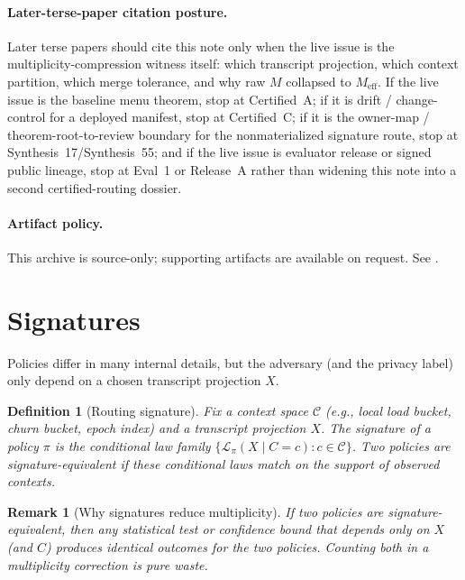\documentclass[11pt]{article}
\newtheorem{definition}{Definition}
\newtheorem{remark}{Remark}
\begin{document}
\paragraph{Later-terse-paper citation posture.}
Later terse papers should cite this note only when the live issue is the multiplicity-compression witness itself: which transcript projection, which context partition, which merge tolerance, and why raw $M$ collapsed to $M_{\mathrm{eff}}$. If the live issue is the baseline menu theorem, stop at Certified~A; if it is drift / change-control for a deployed manifest, stop at Certified~C; if it is the owner-map / theorem-root-to-review boundary for the nonmaterialized signature route, stop at Synthesis~17/Synthesis~55; and if the live issue is evaluator release or signed public lineage, stop at Eval~1 or Release~A rather than widening this note into a second certified-routing dossier.\cite{series:certifiedmenus,series:recert,series:workedexample,series:seriesspines,series:eval1,series:releaseA}

\paragraph{Artifact policy.}
This archive is source-only; supporting artifacts are available on request. See \cite{series:artifactpolicy}.

\section{Signatures}
Policies differ in many internal details, but the adversary (and the privacy label) only depend on a chosen transcript projection $X$.

\begin{definition}[Routing signature]
Fix a context space $\mathcal C$ (e.g., local load bucket, churn bucket, epoch index) and a transcript projection $X$.
The \emph{signature} of a policy $\pi$ is the conditional law family $\{\mathcal L_\pi(X\mid C=c): c\in\mathcal C\}$.
Two policies are signature-equivalent if these conditional laws match on the support of observed contexts.
\end{definition}

\begin{remark}[Why signatures reduce multiplicity]
If two policies are signature-equivalent, then any statistical test or confidence bound that depends only on $X$ (and $C$) produces identical outcomes for the two policies.
Counting both in a multiplicity correction is pure waste.
\end{remark}
\end{document}
